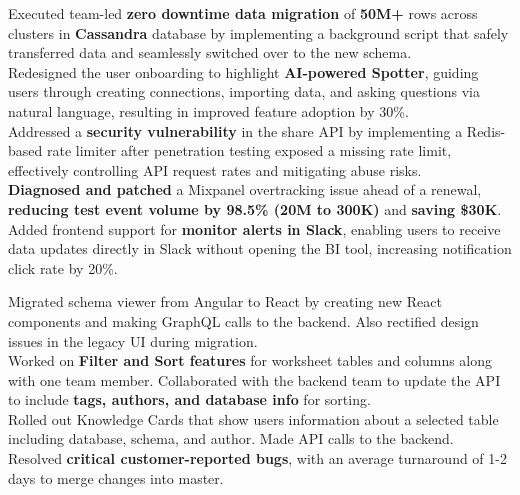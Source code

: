\documentclass[]{Nikhil_Kadiyan_Resume}
\begin{document}
\pt Executed team-led \textbf{zero downtime data migration} of \textbf{50M+} rows across clusters in \textbf{Cassandra} database by implementing a background script that safely transferred data and seamlessly switched over to the new schema.\\
\pt Redesigned the user onboarding to highlight \textbf{AI-powered Spotter}, guiding users through creating connections, importing data, and asking questions via natural language, resulting in improved feature adoption by 30\%.\\
\pt Addressed a \textbf{security vulnerability} in the share API by implementing a Redis-based rate limiter after penetration testing exposed a missing rate limit, effectively controlling API request rates and mitigating abuse risks.\\
\pt \textbf{Diagnosed and patched} a Mixpanel overtracking issue ahead of a renewal, \textbf{reducing test event volume by 98.5\% (20M to 300K)} and \textbf{saving \$30K}.\\ %
\pt Added frontend support for \textbf{monitor alerts in Slack}, enabling users to receive data updates directly in Slack without opening the BI tool, increasing notification click rate by 20\%.\\
\sectionsep

\pt Migrated schema viewer from Angular to React by creating new React components and making GraphQL calls to the backend. Also rectified design issues in the legacy UI during migration.\\
\pt Worked on \textbf{Filter and Sort features} for worksheet tables and columns along with one team member. Collaborated with the backend team to update the API to include \textbf{tags, authors, and database info} for sorting.\\
\pt Rolled out Knowledge Cards that show users information about a selected table including database, schema, and author. Made API calls to the backend.\\
\pt Resolved \textbf{critical customer-reported bugs}, with an average turnaround of 1-2 days to merge changes into master.\\
\sectionsep
\end{document}
